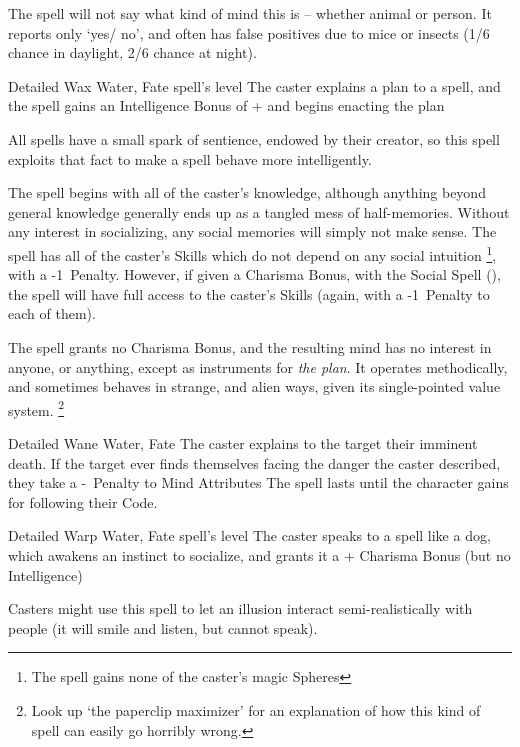 \begin{multicols}{2}
{    The spell will not say what kind of mind this is -- whether animal or person.
    It reports only `yes/ no', and often has false positives due to mice or insects (1/6 chance in daylight, 2/6 chance at night).}


  {Detailed}%
  {Wax}%
  {Water, Fate}%
  {spell's level}%
  {The caster explains a plan to a spell, and the spell gains an Intelligence Bonus of + and begins enacting the plan}%
  {
  All spells have a small spark of sentience, endowed by their creator, so this spell exploits that fact to make a spell behave more intelligently.

  The spell begins with all of the caster's knowledge, although anything beyond general knowledge generally ends up as a tangled mess of half-memories.
  Without any interest in socializing, any social memories will simply not make sense.
  The spell has all of the caster's Skills which do not depend on any social intuition%
  \footnote{The spell gains none of the caster's magic Spheres},
  with a -1~Penalty.
  However, if given a Charisma Bonus, with the Social Spell (), the spell will have full access to the caster's Skills (again, with a -1~Penalty to each of them).

  The spell grants no Charisma Bonus, and the resulting mind has no interest in anyone, or anything, except as instruments for \emph{the plan}.
  It operates methodically, and sometimes behaves in strange, and alien ways, given its single-pointed value system.%
  \footnote{Look up `the paperclip maximizer' for an explanation of how this kind of spell can easily go horribly wrong.}
  }

  {Detailed}%
  {Wane}%
  {Water, Fate}%
  {}%
  {The caster explains to the target their imminent death.
    If the target ever finds themselves facing the danger the caster described, they take a -~Penalty to Mind Attributes}%
  {The spell lasts until the character gains  for following their Code.}




  {Detailed}%
  {Warp}%
  {Water, Fate}%
  {spell's level}%
  {The caster speaks to a spell like a dog, which awakens an instinct to socialize, and grants it a + Charisma Bonus (but no Intelligence)}%
  {
  Casters might use this spell to let an illusion interact semi-realistically with people (it will smile and listen, but cannot speak).

}
\end{multicols}
